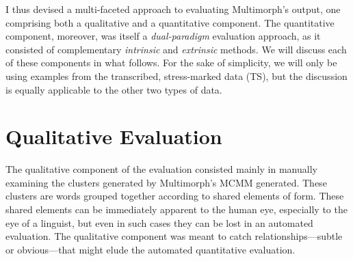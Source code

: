 
I thus devised a multi-faceted approach to evaluating Multimorph's output, one comprising both
a qualitative and a quantitative component. The quantitative component, moreover, 
was itself a \emph{dual-paradigm}
evaluation approach, as it consisted of complementary \emph{intrinsic} and \emph{extrinsic} methods. 
 We will discuss each of these components in what follows. For the sake of simplicity,
we will only be using examples from the transcribed, stress-marked data (TS),
 but the discussion is equally applicable to
the other two types of data.


\section{Qualitative Evaluation} \label{sec:qualitative}
The qualitative component of the evaluation consisted mainly in manually examining the clusters generated by Multimorph's MCMM generated. These clusters are words grouped together according to shared elements of form. These shared elements can be immediately apparent to the human eye, especially to the eye of a linguist, but even in such cases they can be lost in an automated evaluation. %
The qualitative component was meant to catch relationships---subtle or obvious---that might elude the automated 
quantitative evaluation. 

